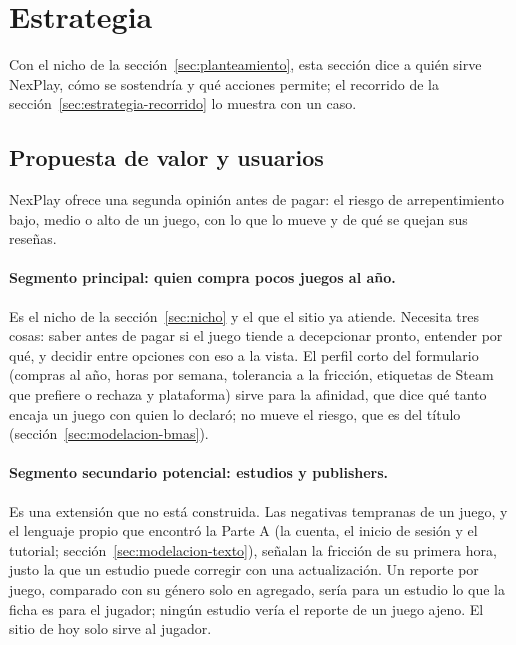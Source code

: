 \section{Estrategia}\label{sec:estrategia}

Con el nicho de la sección~\ref{sec:planteamiento}, esta sección dice a quién sirve NexPlay, cómo
se sostendría y qué acciones permite; el recorrido de la sección~\ref{sec:estrategia-recorrido} lo
muestra con un caso.

\subsection{Propuesta de valor y usuarios}\label{sec:estrategia-usuarios}

NexPlay ofrece una segunda opinión antes de pagar: el riesgo de arrepentimiento bajo, medio o alto
de un juego, con lo que lo mueve y de qué se quejan sus reseñas.

\paragraph{Segmento principal: quien compra pocos juegos al año.} Es el nicho de la
sección~\ref{sec:nicho} y el que el sitio ya atiende. Necesita tres cosas: saber antes de pagar si el
juego tiende a decepcionar pronto, entender por qué, y decidir entre opciones con eso a la vista. El
perfil corto del formulario (compras al año, horas por semana, tolerancia a la fricción, etiquetas de
Steam que prefiere o rechaza y plataforma) sirve para la afinidad, que dice qué tanto encaja un juego
con quien lo declaró; no mueve el riesgo, que es del título (sección~\ref{sec:modelacion-bmas}).

\paragraph{Segmento secundario potencial: estudios y publishers.} Es una extensión que no está
construida. Las negativas tempranas de un juego, y el lenguaje propio que encontró la Parte A (la
cuenta, el inicio de sesión y el tutorial; sección~\ref{sec:modelacion-texto}), señalan la fricción
de su primera hora, justo la que un estudio puede corregir con una actualización. Un reporte por
juego, comparado con su género solo en agregado, sería para un estudio lo que la ficha es para el
jugador; ningún estudio vería el reporte de un juego ajeno.
El sitio de hoy solo sirve al jugador.

